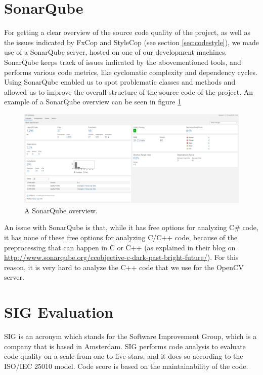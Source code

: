 	\section{SonarQube} \label{sec:sonarqube}
		For getting a clear overview of the source code quality of the project, as 
		well as the issues indicated by FxCop and StyleCop (see section 
		\ref{sec:codestyle}), we made use of a SonarQube server, hosted on one of 
		our development machines. SonarQube keeps track of issues indicated by 
		the abovementioned tools, and performs various code metrics, like cyclomatic 
		complexity and dependency cycles. Using SonarQube enabled us to spot 
		problematic classes and methods and allowed us to improve the overall 
		structure of the source code of the project. An example of a SonarQube
		overview can be seen in figure \ref{fig:sonarqube}
		
		\begin{figure}[!ht]
			\centering
			\includegraphics[width=\textwidth]{SonarQube}
			\caption{A SonarQube overview.}
			\label{fig:sonarqube}
		\end{figure}
		
		An issue with SonarQube is that, while it has free options for analyzing
		C\# code, it has none of these free options for analyzing C/C++ code,
		because of the preprocessing that can happen in C or C++ (as explained
		in their blog on \url{http://www.sonarqube.org/ccobjective-c-dark-past-bright-future/}).
		For this reason, it is very hard to analyze the C++ code that we use for the
		OpenCV server.
		
	\section{SIG Evaluation} \label{sec:sigevaluation}
		SIG is an acronym which stands for the Software Improvement Group,
		which is a company that is based in Amsterdam. SIG performs code
		analysis to evaluate code quality on a scale from one to five stars,
		and it does so according to the ISO/IEC 25010 model. Code score is 
		based on the maintainability of the code.
		

